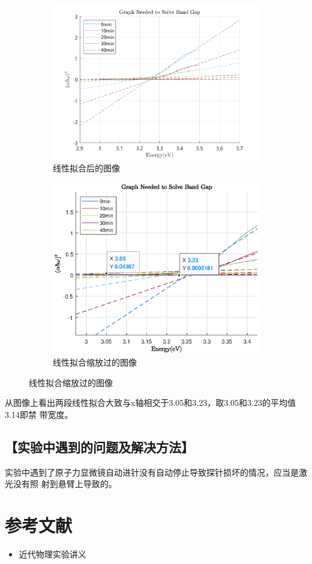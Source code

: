 \documentclass{ctexart}
\let\oldsubsection\subsection
\renewcommand{\subsection}[1]{\oldsubsection{\!\!\!\!\!\!【#1】}}
\begin{document}
\begin{figure}[H]
  \centering
  \begin{subfigure}{.49\textwidth}
    \centering
    \includegraphics[width=\linewidth]{禁带宽度数据处理程序/figures/fitting_result/fitting_result}
    \caption{线性拟合后的图像}
  \end{subfigure}
  \begin{subfigure}{.49\textwidth}
    \centering
    \includegraphics[width=\linewidth]{figures/禁带宽度测量}
    \caption{线性拟合缩放过的图像}
  \end{subfigure}
\end{figure}

从图像上看出两段线性拟合大致与x轴相交于3.05和3.23，取3.05和3.23的平均值3.14即禁
带宽度。

\subsection{实验中遇到的问题及解决方法}

实验中遇到了原子力显微镜自动进针没有自动停止导致探针损坏的情况，应当是激光没有照
射到悬臂上导致的。

\section{参考文献}
\begin{itemize}[leftmargin=0pt]
  \item[] 近代物理实验讲义
\end{itemize}
\end{document}
